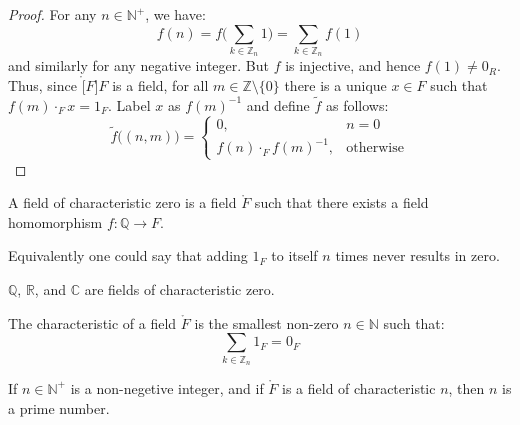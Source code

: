     \begin{proof}
        For any $n\in\mathbb{N}^{+}$, we have:
        \begin{equation}
            f(n)=f\Big(\sum_{k\in\mathbb{Z}_{n}}1\Big)
            =\sum_{k\in\mathbb{Z}_{n}}f(1)
        \end{equation}
        and similarly for any negative integer. But $f$ is injective, and
        hence $f(1)\ne{0}_{R}$. Thus, since $\ring[F]{F}$ is a field, for
        all $m\in\mathbb{Z}\setminus\{0\}$ there is a unique $x\in{F}$ such
        that $f(m)\cdot_{F}x=1_{F}$. Label $x$ as $f(m)^{\minus{1}}$ and
        define $\tilde{f}$ as follows:
        \begin{equation}
            \tilde{f}\big((n,m)\big)=
            \begin{cases}
                0,&n=0\\
                f(n)\cdot_{F}f(m)^{\minus{1}},&\textrm{otherwise}
            \end{cases}
        \end{equation}
    \end{proof}
    \begin{definition}
        A field of characteristic zero is a field $\ring{F}$ such that there
        exists a field homomorphism $f:\mathbb{Q}\rightarrow{F}$.
    \end{definition}
    Equivalently one could say that adding $1_{F}$ to itself $n$ times never
    results in zero.
    \begin{example}
        $\mathbb{Q}$, $\mathbb{R}$, and $\mathbb{C}$ are fields of
        characteristic zero.
    \end{example}
    \begin{definition}
        The characteristic of a field $\ring{F}$ is the smallest non-zero
        $n\in\mathbb{N}$ such that:
        \begin{equation}
            \sum_{k\in\mathbb{Z}_{n}}1_{F}=0_{F}
        \end{equation}
    \end{definition}
    \begin{theorem}
        If $n\in\mathbb{N}^{+}$ is a non-negetive integer, and if
        $\ring{F}$ is a field of characteristic $n$, then $n$ is a prime
        number.
    \end{theorem}
